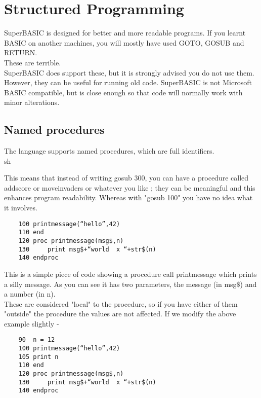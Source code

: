 \chapter{Structured Programming}

SuperBASIC is designed for better and more readable programs. If you learnt BASIC on another machines, you will mostly have used GOTO, GOSUB and RETURN.\\

These are terrible.\\

SuperBASIC does support these, but it is strongly advised you do not use them. However, they can be useful for running old code. SuperBASIC is not Microsoft BASIC compatible, but is close enough so that code will normally work with minor alterations.

\section{Named procedures}

The language supports named procedures, which are full identifiers.\\sh 

This means that instead of writing gosub 300, you can have a procedure called addscore or moveinvaders or whatever you like ; they can be meaningful and this enhances program readability. Whereas with "gosub 100" you have no idea what it involves.\\

\begin{verbatim}
	100 printmessage(“hello”,42)
	110 end
	120 proc printmessage(msg$,n)
	130 	print msg$+“world  x “+str$(n)
	140 endproc
\end{verbatim}

This is a simple piece of code showing a procedure call printmessage which prints a silly message. As you can see it has two parameters, the message (in msg\$) and a number (in n). \\

These are considered "local" to the procedure, so if you have either of them "outside" the procedure the values are not affected. If we modify the above example slightly -

\begin{verbatim}
	90  n = 12
	100 printmessage(“hello”,42)
	105 print n
	110 end
	120 proc printmessage(msg$,n)
	130 	print msg$+“world  x “+str$(n)
	140 endproc
\end{verbatim}

